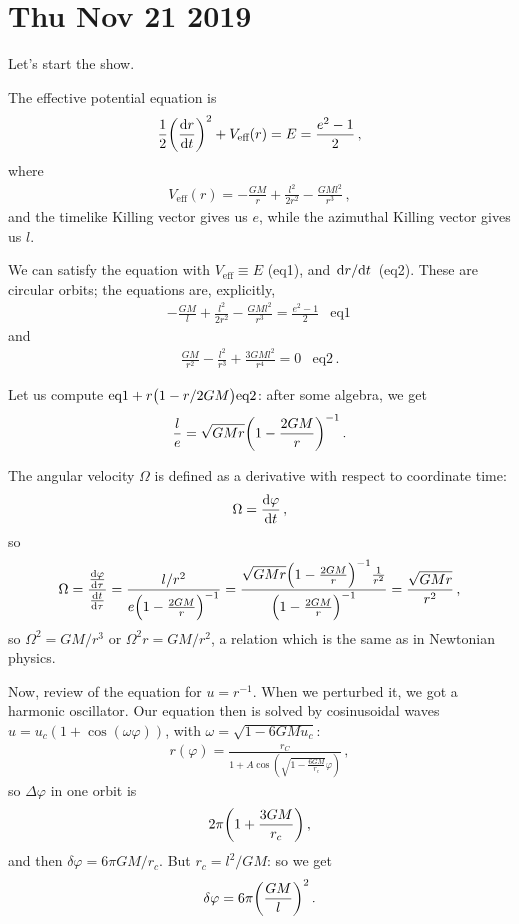 \documentclass[main.tex]{subfiles}
\begin{document}
\section*{Thu Nov 21 2019}

Let's start the show. 

The effective potential equation is 
%
\begin{align}
  \frac{1}{2} \qty(\dv{r}{t})^2 + V _{\text{eff}} (r)
  = E = \frac{e^2-1}{2} 
\,,
\end{align}
%
where 
%
\begin{align}
  V _{\text{eff}}(r) 
  = - \frac{GM}{r} + \frac{l^2}{2r^2} - \frac{GMl^2}{r^3}
\,,
\end{align}
%
and the timelike Killing vector gives us \(e\), while the azimuthal Killing vector gives us \(l\). 

We can satisfy the equation with \(V _{\text{eff}} \equiv E\) (eq1), and \(\dv*{r}{t}\) (eq2). These are circular orbits; the equations are, explicitly, 
%
\begin{align}
  -\frac{GM}{l} + \frac{l^2}{2r^2} - \frac{GMl^2}{r^3} = \frac{e^2-1}{2} & \text{eq1}
\,
\end{align}
%
and 
%
\begin{align}
  \frac{GM}{r^2} - \frac{l^2}{r^3} + \frac{3GMl^2}{r^{4}}=0
  & \text{eq2}
\,.
\end{align}
%

Let us compute \(\text{eq1} + r \qty(1 - r/2GM) \text{eq2}\): after some algebra, we get 
%
\begin{align}
  \frac{l}{e} = \sqrt{GMr} \qty(1 - \frac{2GM}{r})^{-1}
\,.
\end{align}

The angular velocity \(\Omega \) is defined as a derivative with respect to coordinate time: 
%
\begin{align}
  \Omega = \dv{\varphi }{t}
\,,
\end{align}
%
so 
%
\begin{align}
  \Omega = \frac{\dv{\varphi }{\tau }}{\dv{t}{\tau }}
  = \frac{l/r^2}{e \qty(1 - \frac{2GM}{r})^{-1}}
  = \frac{\sqrt{GMr} \qty(1- \frac{2GM}{r})^{-1} \frac{1}{r^2}}{\qty(1 - \frac{2GM}{r})^{-1}} = \frac{\sqrt{GMr}}{r^2}
\,,
\end{align}
%
so \(\Omega^2= GM/ r^3\) or \(\Omega^2 r = GM / r^2\), a relation which is the same as in Newtonian physics. 

Now, review of the equation for \(u = r^{-1}\). When we perturbed it, we got a harmonic oscillator. Our equation then is solved by cosinusoidal waves \(u = u_c (1+\cos(\omega \varphi ))\), with \(\omega = \sqrt{1 - 6GMu_c}\): 
%
\begin{align}
  r(\varphi) = \frac{r_C}{1 + A \cos(\sqrt{1 - \frac{6GM}{r_c}}\varphi )}
\,,
\end{align}
%
so \(\Delta \varphi \) in one orbit is 
%
\begin{align}
  2 \pi \qty(1 + \frac{3GM}{r_c})
\,,
\end{align}
%
and then \(\delta \varphi  = 6 \pi GM / r_c\). But \(r_c = l^2/ GM\): so we get 
%
\begin{align}
  \delta \varphi = 6 \pi \qty(\frac{GM}{l})^2
\,. 
\end{align}
%
\end{document}
